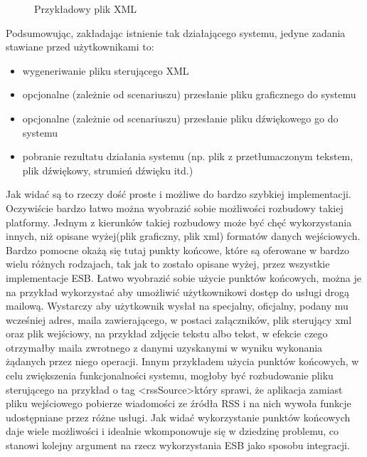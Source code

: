 \setlength\fboxsep{20pt}
\setlength\fboxrule{1pt}
\begin{figure}[!h]
	\centering
	\caption{Przykładowy plik XML}
\end{figure}

Podsumowując, zakładając istnienie tak działającego systemu, jedyne zadania stawiane przed użytkownikami to:
\begin{itemize}
	\item wygeneriwanie pliku sterującego XML
	\item opcjonalne (zależnie od scenariuszu) przesłanie pliku graficznego do systemu
	\item opcjonalne (zależnie od scenariuszu) przesłanie pliku dźwiękowego go do systemu
	\item pobranie rezultatu działania systemu (np. plik z przetłumaczonym tekstem, plik dźwiękowy, strumień dźwięku itd.)
\end{itemize}
Jak widać są to rzeczy dość proste i możliwe do bardzo szybkiej implementacji. Oczywiście bardzo łatwo można wyobrazić sobie możliwości rozbudowy takiej platformy. Jednym z kierunków takiej rozbudowy może być chęć wykorzystania innych, niż opisane wyżej(plik graficzny, plik xml) formatów danych wejściowych.  Bardzo pomocne okażą się tutaj punkty końcowe, które są oferowane w bardzo wielu różnych rodzajach, tak jak to zostało opisane wyżej, przez wszystkie implementacje ESB. Łatwo wyobrazić sobie użycie punktów końcowych, można je na przykład wykorzystać aby umożliwić użytkownikowi dostęp do usługi drogą mailową. Wystarczy aby użytkownik wysłał na specjalny, oficjalny, podany mu wcześniej adres, maila zawierającego, w postaci załączników, plik sterujący xml oraz plik wejściowy, na przykład zdjęcie tekstu albo tekst, w efekcie czego otrzymałby maila zwrotnego z danymi uzyskanymi w wyniku wykonania żądanych przez niego operacji. Innym przykładem użycia punktów końcowych, w celu zwiększenia funkcjonalności systemu, mogłoby być rozbudowanie pliku sterującego na przykład o tag \textless rssSource\textgreater który sprawi, że aplikacja zamiast pliku wejściowego pobierze wiadomości ze źródła RSS i na nich wywoła funkcje udostępniane przez różne usługi. Jak widać wykorzystanie punktów końcowych daje wiele możliwości i idealnie wkomponowuje się w dziedzinę problemu, co stanowi kolejny argument na rzecz wykorzystania ESB jako sposobu integracji.

